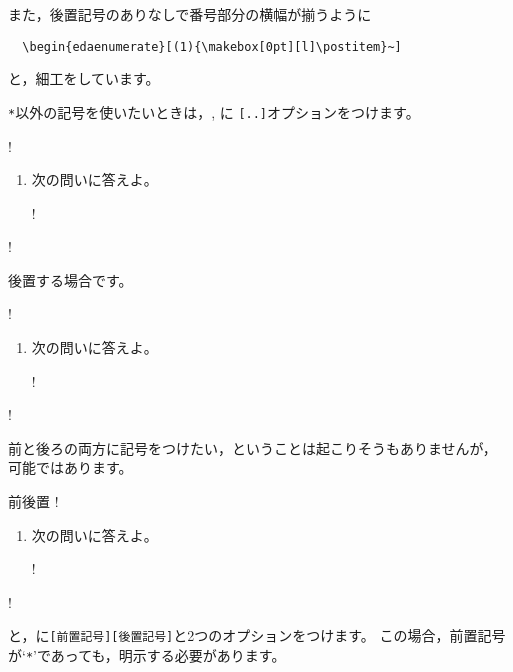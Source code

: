 \documentclass[fleqn,a4j]{jarticle}
\begin{document}
また，後置記号のありなしで番号部分の横幅が揃うように
\begin{jquote}
\begin{verbatim}
  \begin{edaenumerate}[(1){\makebox[0pt][l]\postitem}~]
\end{verbatim}
\end{jquote}
と，細工をしています。

\texttt{*}以外の記号を使いたいときは，,  に
\verb+[..]+オプションをつけます。

\begin{showpEx}{}
!\begin{enumerate}[1.~]
! \item 次の問いに答えよ。
!\end{enumerate}
!\end{showpEx}

後置する場合です。

\begin{showpEx}{}
!\begin{enumerate}[1.~]
! \item 次の問いに答えよ。
!\end{enumerate}
!\end{showpEx}

前と後ろの両方に記号をつけたい，ということは起こりそうもありませんが，
可能ではあります。

\begin{showpEx}{前後置}
!\begin{enumerate}[1.~]
! \item 次の問いに答えよ。
!\end{enumerate}
!\end{showpEx}
と，に\verb+[前置記号][後置記号]+と2つのオプションをつけます。
この場合，前置記号が`\texttt{*}'であっても，明示する必要があります。
\end{document}
